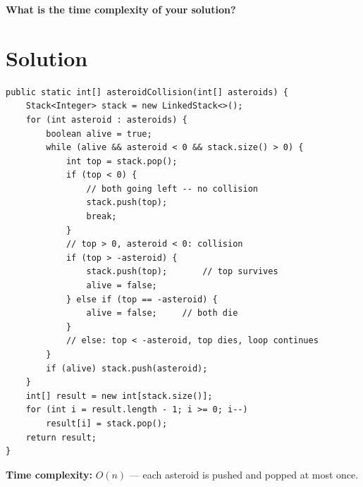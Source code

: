\documentclass[11pt]{article}
\begin{document}
\vfill

\noindent\textbf{What is the time complexity of your solution?} \underline{\hspace{2in}}

\newpage

{\color{blue}
\section*{Solution}

\begin{lstlisting}[basicstyle=\ttfamily\small\color{blue},
  keywordstyle=\bfseries\color{blue!70!black},
  commentstyle=\color{blue!50}]
public static int[] asteroidCollision(int[] asteroids) {
    Stack<Integer> stack = new LinkedStack<>();
    for (int asteroid : asteroids) {
        boolean alive = true;
        while (alive && asteroid < 0 && stack.size() > 0) {
            int top = stack.pop();
            if (top < 0) {
                // both going left -- no collision
                stack.push(top);
                break;
            }
            // top > 0, asteroid < 0: collision
            if (top > -asteroid) {
                stack.push(top);       // top survives
                alive = false;
            } else if (top == -asteroid) {
                alive = false;     // both die
            }
            // else: top < -asteroid, top dies, loop continues
        }
        if (alive) stack.push(asteroid);
    }
    int[] result = new int[stack.size()];
    for (int i = result.length - 1; i >= 0; i--)
        result[i] = stack.pop();
    return result;
}
\end{lstlisting}

\textbf{Time complexity:} $O(n)$ --- each asteroid is pushed and popped at most once.
}
\end{document}
